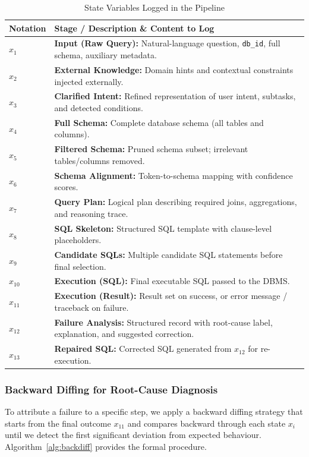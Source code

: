 \documentclass[conference]{IEEEtran}
\begin{document}
\begin{table}[htbp]
\centering
\caption{State Variables Logged in the Pipeline}
\begin{tabular}{lp{6.5cm}}
\toprule
Notation & Stage / Description \& Content to Log \\
\midrule
$x_1$  & \textbf{Input (Raw Query):} Natural-language question, \texttt{db\_id}, full schema, auxiliary metadata. \\
$x_2$  & \textbf{External Knowledge:} Domain hints and contextual constraints injected externally. \\
$x_3$  & \textbf{Clarified Intent:} Refined representation of user intent, subtasks, and detected conditions. \\
$x_4$  & \textbf{Full Schema:} Complete database schema (all tables and columns). \\
$x_5$  & \textbf{Filtered Schema:} Pruned schema subset; irrelevant tables/columns removed. \\
$x_6$  & \textbf{Schema Alignment:} Token-to-schema mapping with confidence scores. \\
$x_7$  & \textbf{Query Plan:} Logical plan describing required joins, aggregations, and reasoning trace. \\
$x_8$  & \textbf{SQL Skeleton:} Structured SQL template with clause-level placeholders. \\
$x_9$  & \textbf{Candidate SQLs:} Multiple candidate SQL statements before final selection. \\
$x_{10}$ & \textbf{Execution (SQL):} Final executable SQL passed to the DBMS. \\
$x_{11}$ & \textbf{Execution (Result):} Result set on success, or error message / traceback on failure. \\
$x_{12}$ & \textbf{Failure Analysis:} Structured record with root-cause label, explanation, and suggested correction. \\
$x_{13}$ & \textbf{Repaired SQL:} Corrected SQL generated from $x_{12}$ for re-execution. \\
\bottomrule
\end{tabular}
\label{tab:logging}
\end{table}

\subsubsection{Backward Diffing for Root-Cause Diagnosis}

To attribute a failure to a specific step, we apply a backward diffing
strategy that starts from the final outcome $x_{11}$ and compares backward
through each state $x_i$ until we detect the first significant deviation from
expected behaviour. Algorithm~\ref{alg:backdiff} provides the formal
procedure.
\end{document}
